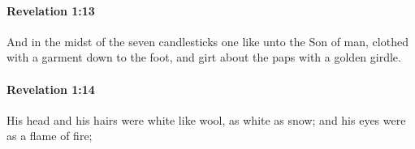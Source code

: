 		\paragraph{Revelation 1:13} %
			\label{REVELATIONNT-1-13}

			And in the midst of the seven candlesticks one like unto the Son of man, clothed with a garment down to the foot, and girt about the paps with a golden girdle.

			\begin{framed}
			\scriptsize
				\begin{compactdesc}
					\item[SBLG] 
				\end{compactdesc}
			\end{framed}

		\paragraph{Revelation 1:14} %
			\label{REVELATIONNT-1-14}

			His head and his hairs were white like wool, as white as snow; and his eyes were as a flame of fire;

